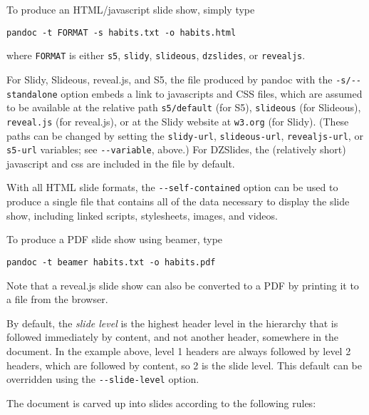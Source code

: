 \documentclass[]{article}
\begin{document}
To produce an HTML/javascript slide show, simply type

\begin{verbatim}
pandoc -t FORMAT -s habits.txt -o habits.html
\end{verbatim}

where \texttt{FORMAT} is either \texttt{s5}, \texttt{slidy},
\texttt{slideous}, \texttt{dzslides}, or \texttt{revealjs}.

For Slidy, Slideous, reveal.js, and S5, the file produced by pandoc with
the \texttt{-s/-{}-standalone} option embeds a link to javascripts and
CSS files, which are assumed to be available at the relative path
\texttt{s5/default} (for S5), \texttt{slideous} (for Slideous),
\texttt{reveal.js} (for reveal.js), or at the Slidy website at
\texttt{w3.org} (for Slidy). (These paths can be changed by setting the
\texttt{slidy-url}, \texttt{slideous-url}, \texttt{revealjs-url}, or
\texttt{s5-url} variables; see \texttt{-{}-variable}, above.) For
DZSlides, the (relatively short) javascript and css are included in the
file by default.

With all HTML slide formats, the \texttt{-{}-self-contained} option can
be used to produce a single file that contains all of the data necessary
to display the slide show, including linked scripts, stylesheets,
images, and videos.

To produce a PDF slide show using beamer, type

\begin{verbatim}
pandoc -t beamer habits.txt -o habits.pdf
\end{verbatim}

Note that a reveal.js slide show can also be converted to a PDF by
printing it to a file from the browser.


By default, the \emph{slide level} is the highest header level in the
hierarchy that is followed immediately by content, and not another
header, somewhere in the document. In the example above, level 1 headers
are always followed by level 2 headers, which are followed by content,
so 2 is the slide level. This default can be overridden using the
\texttt{-{}-slide-level} option.

The document is carved up into slides according to the following rules:
\end{document}
